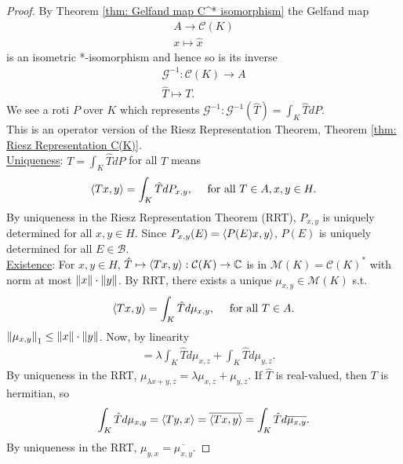 \documentclass{article}
\begin{document}
\begin{proof}
    By Theorem \ref{thm: Gelfand map C^* isomorphism} the Gelfand map 
    $$
    \begin{array}{cc}
         A\to \mathcal{C}(K)\\
         x\mapsto \hat{x}
    \end{array}
    $$
    is an isometric *-isomorphism and hence so is its inverse 
    $$
    \begin{array}{cc}
         \mathcal{G}^{-1}:\mathcal{C}(K)\to A\\
         \hat{T}\mapsto T.
    \end{array}
    $$
    We see a roti $P$ over $K$ which represents $\mathcal{G}^{-1}: \mathcal{G}^{-1}(\hat{T})=\displaystyle\int_K \hat{T}dP$.\\

    This is an operator version of the Riesz Representation Theorem, Theorem \ref{thm: Riesz Representation C(K)}.\\

    \noindent\underline{Uniqueness}: $T = \displaystyle\int_K \hat{T}dP$ for all $T$ means
    $$
    \langle Tx, y\rangle = \displaystyle\int_K \hat{T}dP_{x,y}, \quad \text{ for all }T\in A, x,y\in H.
    $$
    By uniqueness in the Riesz Representation Theorem (RRT), $P_{x,y}$ is uniquely determined for all $x,y\in H$. Since $P_{x,y}(E) = \langle P(E)x, y\rangle$, $P(E)$ is uniquely determined for all $E\in \mathcal{B}$.\\

    \noindent\underline{Existence}: For $x,y\in H$, $\hat{T}\mapsto \bracket{Tx}{y}:\mathcal{C}(K)\to \C$ is in $\mathcal{M}(K)=\mathcal{C}(K)^*$ with norm at most $\norm{x}\cdot\norm{y}$. By RRT, there exists a unique $\mu_{x,y}\in \mathcal{M}(K)$ s.t. 
    $$
    \bracket{Tx}{y} = \displaystyle\int_K \hat{T}d\mu_{x,y}, \quad \text{ for all }T\in A.
    $$
    $\norm{\mu_{x,y}}_1\leq \norm{x}\cdot \norm{y}$. Now, by linearity
    $$
    \begin{array}{ll}
        
        &= \lambda \displaystyle\int_K \hat{T}d\mu_{x,z}+\displaystyle\int_K \hat{T}d\mu_{y,z}.
    \end{array}
    $$
    By uniqueness in the RRT, $\mu_{\lambda x+y,z}=\lambda\mu_{x,z}+\mu_{y,z}$. If $\hat{T}$ is real-valued, then $T$ is hermitian, so 
    $$
    \displaystyle\int_K \hat{T}d\mu_{x,y} = \bracket{Ty}{x}= \overline{\bracket{Tx}{y}}=\displaystyle\int_K \hat{T}d\overline{\mu_{x,y}}.
    $$
    By uniqueness in the RRT, $\mu_{y,x}=\overline{\mu_{x,y}}$.


\end{proof}
\end{document}
